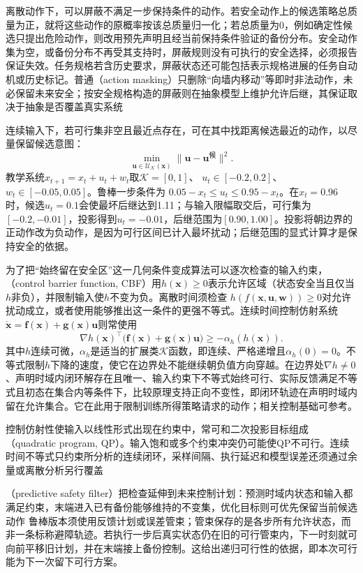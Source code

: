 离散动作下，可以屏蔽不满足一步保持条件的动作。若安全动作上的候选策略总质量为正，就将这些动作的原概率按该总质量归一化；若总质量为0，例如确定性候选只提出危险动作，则改用预先声明且经当前保持条件验证的备份分布。安全动作集为空，或备份分布不再受其支持时，屏蔽规则没有可执行的安全选择，必须报告保证失效。任务规格若含历史要求，屏蔽状态还可能包括表示规格进展的任务自动机或历史标记。普通（action masking）只删除“向墙内移动”等即时非法动作，未必保留未来安全；按安全规格构造的屏蔽则在抽象模型上维护允许后继，其保证取决于抽象是否覆盖真实系统

连续输入下，若可行集非空且最近点存在，可在其中找距离候选最近的动作，以尽量保留候选意图：
\[
  \min_{\bm{u}\in\mathcal U_{\mathcal K}(\bm{x})}
          \|\bm{u}-\bm{u}^{\text{候}}\|^2.
\]
教学系统$x_{t+1}=x_t+u_t+w_t$取$\mathcal K=[0,1]$、
$u_t\in[-0.2,0.2]$、$w_t\in[-0.05,0.05]$。鲁棒一步条件为
$0.05-x_t\leq u_t\leq0.95-x_t$。在$x_t=0.96$时，候选$u_t=0.1$会使最坏后继达到1.11；与输入限幅取交后，可行集为$[-0.2,-0.01]$，投影得到$u_t=-0.01$，后继范围为$[0.90,1.00]$。投影将朝边界的正动作改为负动作，是因为可行区间已计入最坏扰动；后继范围的显式计算才是保持安全的依据。

为了把“始终留在安全区”这一几何条件变成算法可以逐次检查的输入约束，（control barrier function, CBF）用$h(\bm{x})\geq0$表示允许区域（状态安全当且仅当$h$非负），并限制输入使$h$不变为负。离散时间须检查
$h(f(\bm{x},\bm{u},\bm{w}))\geq0$对允许扰动成立，或者使用能够推出这一条件的更强不等式。连续时间控制仿射系统
$\dot{\bm{x}}=\bm{f}(\bm{x})+\bm{g}(\bm{x})\bm{u}$则常使用
\[
  \nabla h(\bm{x})^\top
       \bigl(\bm{f}(\bm{x})+\bm{g}(\bm{x})\bm{u}\bigr)
        \geq-\alpha_h(h(\bm{x})).
\]
其中$h$连续可微，$\alpha_h$是适当的扩展类$\mathcal K$函数，即连续、严格递增且$\alpha_h(0)=0$。不等式限制$h$下降的速度，使它在边界处不能继续朝负值方向穿越。在边界处$\nabla h\neq0$、声明时域内闭环解存在且唯一、输入约束下不等式始终可行、实际反馈满足不等式且初态在集合内等条件下，比较原理支持正向不变性，即闭环轨迹在声明时域内留在允许集合。它在此用于限制训练所得策略请求的动作；相关控制基础可参考。

控制仿射性使输入以线性形式出现在约束中，常可和二次投影目标组成（quadratic program, QP）。输入饱和或多个约束冲突仍可能使QP不可行。连续时间不等式只约束所分析的连续闭环，采样间隔、执行延迟和模型误差还须通过余量或离散分析另行覆盖

（predictive safety filter）把检查延伸到未来控制计划：预测时域内状态和输入都满足约束，末端进入已有备份能够维持的不变集，优化目标则可优先保留当前候选动作
鲁棒版本须使用反馈计划或误差管束；管束保存的是各步所有允许状态，而非一条标称避障轨迹。若执行一步后真实状态仍在旧的可行管束内，下一时刻就可向前平移旧计划，并在末端接上备份控制。这给出递归可行性的依据，即本次可行能为下一次留下可行方案。

